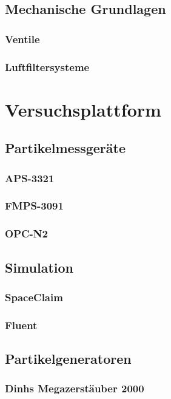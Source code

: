 \section{Mechanische Grundlagen}
\subsection{Ventile}
\subsection{Luftfiltersysteme}

%

\chapter{Versuchsplattform}\label{ch:platform}
\section{Partikelmessger\"{a}te}
\subsection{APS-3321}
\subsection{FMPS-3091}
\subsection{OPC-N2}

\section{Simulation}
\subsection{SpaceClaim}
\subsection{Fluent}

\section{Partikelgeneratoren}
\subsection{Dinhs Megazerst\"{a}uber 2000}
